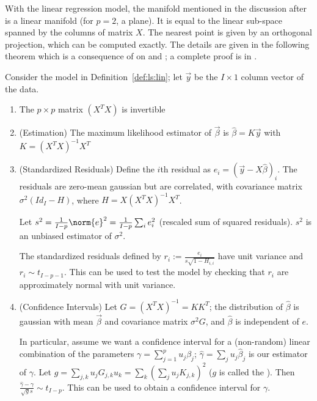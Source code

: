With the linear regression model, the manifold mentioned in the
discussion after  is a linear manifold (for
$p=2$, a plane). It is equal to the linear sub-space spanned by
the columns of matrix $X$. The nearest point is given by an
orthogonal projection, which can be computed exactly. The
details are given in the following theorem which is a
consequence of  on
 and ; a complete
proof is in \cite[section 2.3]{davison2003sm}.

\begin{shadethm}
Consider the model in Definition~\ref{def:ls:lin}; let $\vec{y}$ be
the $I\times1$ column vector of the data.
 \begin{enumerate}
  \item The $p\times p$ matrix $(X^T X)$ is invertible
  \item (Estimation) The maximum likelihood estimator of $\vec{\beta}$ is
  $\hat{\beta}=K \vec{y}$ with $K=(X^T X)^{-1}X^T$
  \item (Standardized Residuals) Define the $i$th residual as
 $e_i= \left(\vec{y}- X\hat{\beta}\right)_i$. The residuals are zero-mean gaussian but are
correlated, with covariance matrix $\sigma^2 (Id_I -H)$, where
 $H=X (X^T X)^{-1}X^T$.

Let
 $s^2=\frac{1}{I-p}\norm{e}^2=\frac{1}{I-p}\sum_i e_i^2$ (rescaled sum of squared
 residuals). $s^2$ is an unbiased estimator of $\sigma^2$.


 The standardized residuals defined by $r_i:=\frac{e_i}{s
  \sqrt{1-H_{i,i}}}$ have unit variance and $r_i \sim
  t_{I-p-1}$. This can be used to test the model by
  checking that $r_i$ are approximately normal with unit
  variance.
  \item (Confidence Intervals)
  Let $G=\left(X^T X\right)^{-1}=KK^T$; the distribution of $\hat{\beta}$ is gaussian with mean
$\vec{\beta}$ and covariance matrix $\sigma^2 G$, and
$\hat{\beta}$ is independent of $e$.

In particular, assume we want a confidence interval for a (non-random) linear combination of the parameters $\gamma=\sum_{j=1}^{p} u_j \beta_j$;
 $\hat{\gamma}=\sum_j
u_j\hat{\beta}_j$ is our estimator of $\gamma$. Let
$g=\sum_{j,k}u_j G_{j,k} u_k=\sum_k
\left(\sum_j u_j K_{j,k} \right)^2$ ($g$ is
called the ). Then $
\frac{\hat{\gamma}-\gamma}{\sqrt{g}s} \sim
t_{I-p} $. This can be used to obtain a
confidence interval for $\gamma$.
 \end{enumerate}
 \label{theo:lr}
\end{shadethm}
%
%

